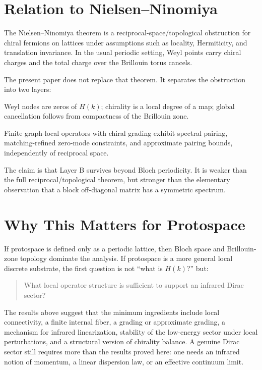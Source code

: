 \documentclass[11pt,a4paper]{article}
\begin{document}
\section{Relation to Nielsen--Ninomiya}

The Nielsen--Ninomiya theorem is a reciprocal-space/topological obstruction for
chiral fermions on lattices under assumptions such as locality, Hermiticity,
and translation invariance. In the usual periodic setting, Weyl points carry
chiral charges and the total charge over the Brillouin torus cancels.

The present paper does not replace that theorem. It separates the obstruction
into two layers:
\begin{description}[leftmargin=2.6cm,style=nextline]
\item[Layer A] Weyl nodes are zeros of $H(k)$; chirality is a local degree of
a map; global cancellation follows from compactness of the Brillouin zone.
\item[Layer B] Finite graph-local operators with chiral grading exhibit
spectral pairing, matching-refined zero-mode constraints, and approximate
pairing bounds, independently of reciprocal space.
\end{description}
The claim is that Layer B survives beyond Bloch periodicity. It is weaker than
the full reciprocal/topological theorem, but stronger than the elementary
observation that a block off-diagonal matrix has a symmetric spectrum.

\section{Why This Matters for Protospace}

If protospace is defined only as a periodic lattice, then Bloch space and
Brillouin-zone topology dominate the analysis. If protospace is a more general
local discrete substrate, the first question is not ``what is $H(k)$?'' but:
\begin{quote}
What local operator structure is sufficient to support an infrared Dirac
sector?
\end{quote}

The results above suggest that the minimum ingredients include local
connectivity, a finite internal fiber, a grading or approximate grading, a
mechanism for infrared linearization, stability of the low-energy sector under
local perturbations, and a structural version of chirality balance. A genuine
Dirac sector still requires more than the results proved here: one needs an
infrared notion of momentum, a linear dispersion law, or an effective continuum
limit.
\end{document}
